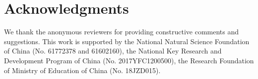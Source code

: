 \documentclass[letterpaper]{article} \usepackage{aaai21}  \usepackage{times}  \usepackage{helvet} \usepackage{courier}  \usepackage[hyphens]{url}  \usepackage{graphicx} \urlstyle{rm} \def\UrlFont{\rm}  \usepackage{natbib}  \usepackage{caption}
\begin{document}
\newpage




\section*{Acknowledgments}

We thank the anonymous reviewers for providing constructive comments and suggestions.
This work is supported by the National Natural Science Foundation of China (No. 61772378 and 61602160), 
the National Key Research and Development Program of China (No. 2017YFC1200500), 
the Research Foundation of Ministry of Education of China (No. 18JZD015).







\end{document}
